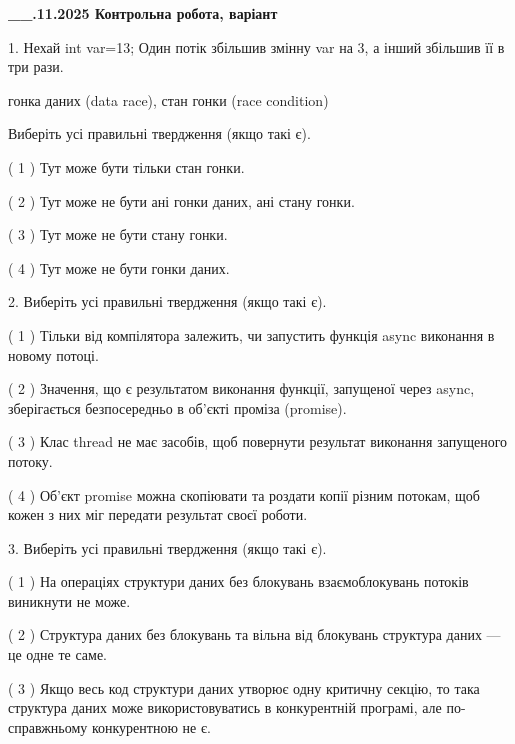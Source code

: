 \documentclass[12pt, ukrainian]{article}
\begin{document}
\newpage
\begin {large}

\textbf{\_\_.11.2025 Контрольна робота, варіант  }\par


{
1. Нехай int var=13; Один потік збільшив змінну var на 3, а інший збільшив її в три рази.

гонка даних (data race), стан гонки (race condition)

Виберіть усі правильні твердження (якщо такі є).\par
\vspace{2mm}
( 1 ) Тут може бути тільки стан гонки.%

( 2 ) Тут може не бути ані гонки даних, ані стану гонки.%

( 3 ) Тут може не бути стану гонки.%

( 4 ) Тут може не бути гонки даних.%


2. Виберіть усі правильні твердження (якщо такі є).\par
\vspace{2mm}

( 1 ) Тільки від компілятора залежить, чи запустить функція async виконання в новому потоці.%

( 2 ) Значення, що є результатом виконання функції, запущеної через async, зберігається безпосередньо в об’єкті проміза (promise).%

( 3 ) Клас thread не має засобів, щоб повернути результат виконання запущеного потоку.%

( 4 ) Об’єкт promise можна скопіювати та роздати копії різним потокам, щоб кожен з них міг передати результат своєї роботи.%


3. Виберіть усі правильні твердження (якщо такі є).\par
\vspace{2mm}

( 1 ) На операціях структури даних без блокувань взаємоблокувань потоків виникнути не може.%

( 2 ) Структура даних без блокувань та вільна від блокувань структура даних --- це одне те саме.%

( 3 ) Якщо весь код структури даних утворює одну критичну секцію, то така структура даних може використовуватись в конкурентній програмі, але по-справжньо\-му конкурентною не є.%

}
\end{large}
\end{document}
